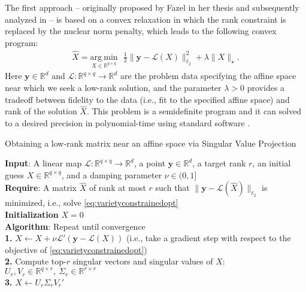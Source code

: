 \documentclass[11pt,letterpaper]{article}
\newcommand{\R}{\mathbb{R}}
\newcommand{\by}{\mathbf{y}}
\renewcommand{\L}{\mathcal{L}}
\newcommand{\argmin}{\mathrm{arg~min}}
\begin{document}
The first approach -- originally proposed by Fazel in her thesis \cite{Faz:02} and subsequently analyzed in \cite{CanRec:09,RFP:10} -- is based on a convex relaxation in which the rank constraint is replaced by the nuclear norm penalty, which leads to the following convex program:
\begin{equation} \label{eq:nuclearnormlasso}
\begin{aligned}
\hat{X} = \underset{X \in \R^{q \times q}}{\argmin} ~~~ \tfrac{1}{2} \|\by - \L(X) \|_{\ell_2}^2 + \lambda \|X\|_\star.
\end{aligned}
\end{equation}
Here $\by \in \R^d$ and $\L : \R^{q \times q} \rightarrow \R^d$ are the problem data specifying the affine space near which we seek a low-rank solution, and the parameter $\lambda > 0$ provides a tradeoff between fidelity to the data (i.e., fit to the specified affine space) and rank of the solution $\hat{X}$.  This problem is a semidefinite program and it can solved to a desired precision in polynomial-time using standard software \cite{NesNem:94,sdpt3:1}.

\begin{algorithm}[t] 
    \caption{Obtaining a low-rank matrix near an affine space via Singular Value Projection}
    \label{alg:svp}
    \textbf{Input}: A linear map $\L: \R^{q \times q} \rightarrow \R^d$, a point $\by \in \R^d$, a target rank $r$, an initial guess $X \in \R^{q \times q}$, and a damping parameter $\nu \in (0,1]$ \\
    \textbf{Require}: A matrix $\hat{X}$ of rank at most $r$ such that $\|\by - \L(\hat{X}) \|_{\ell_2}$ is minimized, i.e., solve \eqref{eq:varietyconstrainedopt} \\
    \textbf{Initialization} ‎$X = 0$ \\
    \textbf{Algorithm}: Repeat until convergence \\
    \textbf{1.} $X \leftarrow X + \nu \L' (\by - \L(X))$ (i.e., take a gradient step with respect to the objective of \eqref{eq:varietyconstrainedopt}) \\
    \textbf{2.} Compute top-$r$ singular vectors and singular values of $X$: $U_r, V_r \in \R^{q \times r}, ~ \Sigma_r \in \R^{r \times r}$ \\
    \textbf{3.} $X \leftarrow U_r \Sigma_r V_r'$

\end{algorithm}
\end{document}
